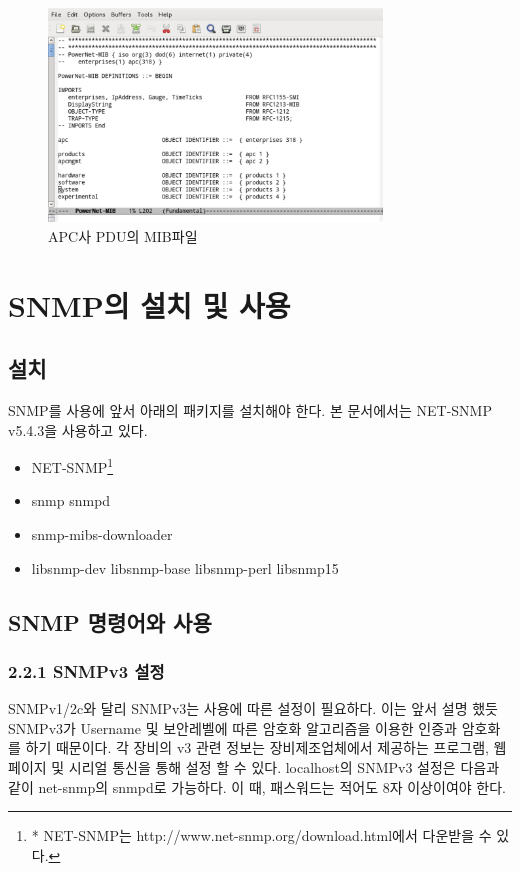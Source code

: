 \documentclass[11pt
  , a4paper
  , article
  , oneside
]{memoir}
\begin{document}
\begin{figure}[h]
  \centering
  \includegraphics[width=0.79\textwidth]{./images/pdu_mib.eps}
  \caption{APC사 PDU의 MIB파일}
  \label{fig:pdu_mib}   
\end{figure}


\clearpage

\chapter{SNMP의 설치 및 사용}
\section{설치}
SNMP를 사용에 앞서 아래의 패키지를 설치해야 한다. 본 문서에서는 NET-SNMP\citep{net_snmp} v5.4.3을 사용하고 있다.
\begin{itemize}
\item NET-SNMP\footnote{* NET-SNMP는 http://www.net-snmp.org/download.html에서 다운받을 수 있다.}
\item snmp snmpd
\item snmp-mibs-downloader
\item libsnmp-dev libsnmp-base libsnmp-perl libsnmp15 
\end{itemize}


\section{SNMP 명령어와 사용}

\subsection{2.2.1 SNMPv3 설정}
SNMPv1/2c와 달리 SNMPv3는 사용에 따른 설정이 필요하다. 이는 앞서 설명 했듯 SNMPv3가 Username 및 보안레벨에 따른 암호화 알고리즘을 이용한 인증과 암호화를 하기 때문이다. 각 장비의 v3 관련 정보는 장비제조업체에서 제공하는 프로그램, 웹 페이지 및 시리얼 통신을 통해 설정 할 수 있다. localhost의 SNMPv3 설정은 다음과 같이 net-snmp의 snmpd로 가능하다. 이 때, 패스워드는 적어도 8자 이상이여야 한다.
\end{document}
